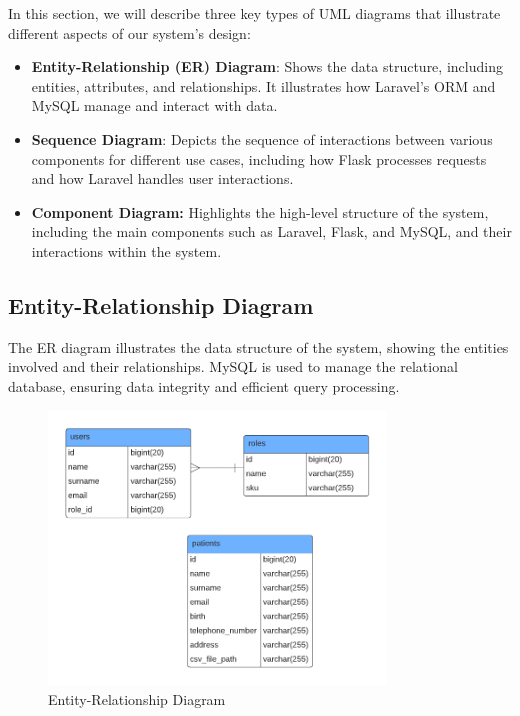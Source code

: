 \documentclass{article}
\begin{document}
In this section, we will describe three key types of UML diagrams that illustrate different aspects of our system's design:

\begin{itemize}
    \item \textbf{Entity-Relationship (ER) Diagram}: Shows the data structure, including entities, attributes, and relationships. It illustrates how Laravel's ORM and MySQL manage and interact with data.
    \item \textbf{Sequence Diagram}: Depicts the sequence of interactions between various components for different use cases, including how Flask processes requests and how Laravel handles user interactions.
    \item \textbf{Component Diagram:} Highlights the high-level structure of the system, including the main components such as Laravel, Flask, and MySQL, and their interactions within the system.
\end{itemize}

\subsection{Entity-Relationship Diagram}
The ER diagram illustrates the data structure of the system, showing the entities involved and their relationships. MySQL is used to manage the relational database, ensuring data integrity and efficient query processing.



\begin{figure}[h]
\centering
\includegraphics[width=0.8\textwidth]{Images/Diagrams/er.png}
\caption{Entity-Relationship Diagram}
\end{figure}
\end{document}
